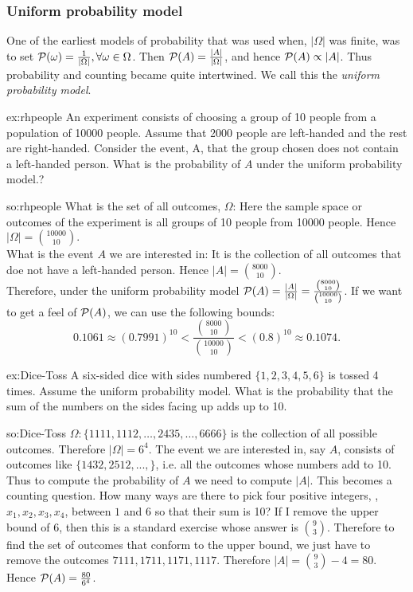 \subsubsection{Uniform probability model}
One of the earliest models of probability that was used when, $|\Omega|$ was finite, was to set $\mathcal{P}(\omega)=\frac{1}{|\Omega|}, \forall \omega \in \Omega$.
Then $\mathcal{P}(A) = \frac{|A|}{|\Omega|}$, and hence $\mathcal{P}(A) \propto |A|$. Thus probability and counting became quite intertwined. We call this the \textit{uniform probability model}.



\begin{excr}{ex:rhpeople}
 An experiment consists of choosing a group of 10 people from a population of 10000 people. Assume that 2000 people are left-handed and the rest are right-handed. Consider the event, A, that the group chosen does not contain a left-handed person. What is the probability of $A$ under the uniform probability model.?
\end{excr}
\begin{soln}{so:rhpeople}
What is the set of all outcomes, $\Omega$: Here the sample space or outcomes of the experiment is  all groups of 10 people from 10000 people. Hence $|\Omega|=\binom{10000}{10}.$ \\
What is the event $A$ we are interested in: It is the collection of all outcomes that doe not have a left-handed person. Hence $|A|=\binom{8000}{10}$.\\
Therefore, under the uniform probability model $\mathcal{P}(A) = \frac{|A|}{|\Omega|} = \frac{\binom{8000}{10}}{\binom{10000}{10}}$. If we want to get a feel of $\mathcal{P}(A)$, we can use the following bounds:
$$0.1061 \approx (0.7991)^{10} <  \frac{\binom{8000}{10}}{\binom{10000}{10}} < (0.8)^{10} \approx 0.1074.$$
\end{soln}

 \begin{excr}{ex:Dice-Toss}
 A six-sided dice with sides numbered $\{1,2,3,4,5,6\}$ is tossed 4 times. Assume the uniform probability model. What is the probability that the sum of the numbers on the sides facing up adds up to 10.
 \end{excr}
 \begin{soln}{so:Dice-Toss}
 $\Omega: \{1111,1112,\ldots,2435, \ldots, 6666  \}$ is the collection of all possible outcomes. Therefore $|\Omega| = 6^4$. The event we are interested in, say $A$, consists of outcomes like $\{1432, 2512,...,\}$, i.e. all the outcomes whose numbers add to 10. Thus to compute the probability of $A$ we need to compute $|A|$. This becomes a counting question. How many ways are there to pick four positive integers, , $x_1, x_2, x_3, x_4$, between $1$ and $6$ so that their sum is 10? If I remove the upper bound of $6$, then this is a standard exercise whose answer is $\binom{9}{3}$. Therefore to find the set of outcomes that conform to the upper bound, we just have to remove the outcomes $7111,1711,1171,1117$. Therefore $|A|=\binom{9}{3} - 4 =80$. Hence $\mathcal{P}(A) = \frac{80}{6^4}$.
 \end{soln}

